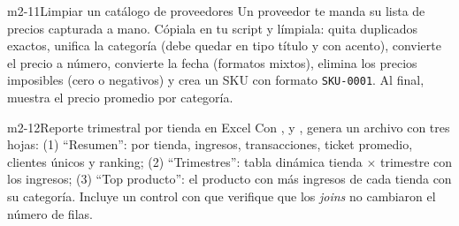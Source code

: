 \begin{ejercicio}{m2-11}{Limpiar un catálogo de proveedores}
Un proveedor te manda su lista de precios capturada a mano. Cópiala en tu
script y límpiala: quita duplicados exactos, unifica la categoría (debe
quedar en tipo título y con acento), convierte el precio a número, convierte
la fecha (formatos mixtos), elimina los precios imposibles (cero o
negativos) y crea un SKU con formato \texttt{SKU-0001}. Al final, muestra el
precio promedio por categoría.
\end{ejercicio}

\begin{ejercicio}{m2-12}{Reporte trimestral por tienda en Excel}
Con ,  y
, genera un archivo
 con tres hojas: (1)
``Resumen'': por tienda, ingresos, transacciones, ticket promedio, clientes
únicos y ranking; (2) ``Trimestres'': tabla dinámica tienda $\times$
trimestre con los ingresos; (3) ``Top producto'': el producto con más
ingresos de cada tienda con su categoría. Incluye un control con
 que verifique que los \emph{joins} no cambiaron el
número de filas.
\end{ejercicio}
